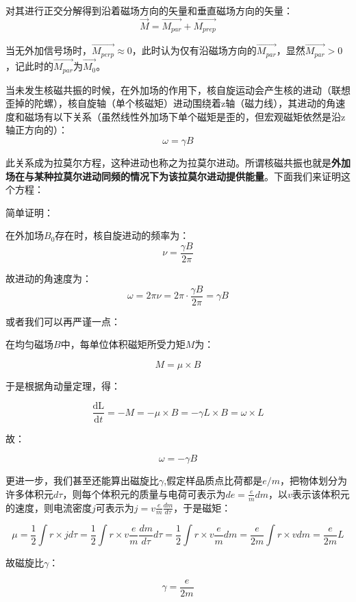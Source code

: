 对其进行正交分解得到沿着磁场方向的矢量和垂直磁场方向的矢量：
\[\overrightarrow{M}=\overrightarrow{M_{par}}+\overrightarrow{M_{prep}} \]

当无外加信号场时，$\overrightarrow{M_{perp}} \approx 0$，此时认为仅有沿磁场方向的$\overrightarrow{M_{par}}$，显然$\overrightarrow{M_{par}}>0$，记此时的$\overrightarrow{M_{par}}$为$\overrightarrow{M_0}$。

当未发生核磁共振的时候，在外加场的作用下，核自旋运动会产生核的进动（联想歪掉的陀螺），核自旋轴（单个核磁矩）进动围绕着z轴（磁力线），其进动的角速度和磁场有以下关系（虽然线性外加场下单个磁矩是歪的，但宏观磁矩依然是沿z轴正方向的）：
\[\omega=\gamma B \tag{c}\]

此关系成为拉莫尔方程，这种进动也称之为拉莫尔进动。所谓核磁共振也就是\textbf{外加场在与某种拉莫尔进动同频的情况下为该拉莫尔进动提供能量}。下面我们来证明这个方程：

简单证明：

在外加场$B_0$存在时，核自旋进动的频率为：
\[\nu = \frac{\gamma B}{2 \pi}\]

故进动的角速度为：
\[\omega = 2 \pi \nu =2 \pi \cdot \frac{\gamma B}{2 \pi}= \gamma B\]

或者我们可以再严谨一点：

在均匀磁场$B$中，每单位体积磁矩所受力矩$M$为：

\[M=\mu \times B\]

于是根据角动量定理，得：

\[\frac{\mathrm{dL}}{\mathrm{d}t}=-M=-\mu \times B=-\gamma L \times B=\omega \times L\]

故：

\[\omega=-\gamma B\]

更进一步，我们甚至还能算出磁旋比$\gamma$,假定样品质点比荷都是$e/m$，把物体划分为许多体积元$d\tau$，则每个体积元的质量与电荷可表示为$de=\frac{e}{m}dm$，以$v$表示该体积元的速度，则电流密度$j$可表示为$j=v\frac{e}{m}\frac{dm}{d\tau}$，于是磁矩：

\[\mu=\frac{1}{2}\int r \times j d\tau=\frac{1}{2}\int r \times v\frac{e}{m}\frac{dm}{d\tau} d\tau=\frac{1}{2}\int r \times v\frac{e}{m}dm=\frac{e}{2m}\int r \times v dm=\frac{e}{2m}L\]

故磁旋比$\gamma$：

\[\gamma=\frac{e}{2m}\]

